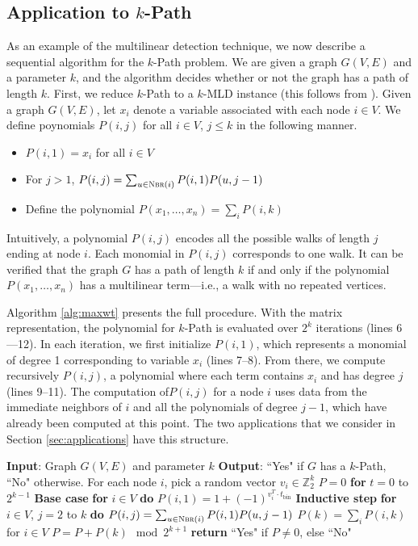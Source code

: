 \subsection{Application to $k$-Path}
As an example of the multilinear detection technique, we now describe a sequential algorithm for the $k$-Path problem. We are given a graph $G(V,E)$ and a parameter $k$, and the algorithm decides whether or not the graph has a path of length $k$. First, we reduce $k$-Path to a $k$-MLD instance (this follows from \cite{koutis:icalp08, williams2009finding}). Given a graph $G(V, E)$, let $x_i$ denote a variable associated with each node $i\in V$.
We define poynomials $P(i, j)$ for all $i\in V$, $j\leq k$ in the following manner.

\begin{itemize}
\item
$P(i, 1) = x_i$ for all $i\in V$
\item
For $j>1$,
$P(i, j) = \sum_{u\in\textsc{Nbr}(i)} P(i,1)P(u, j-1)$
\item
Define the polynomial $P(x_1,\ldots,x_n) = \sum_i P(i, k)$
\end{itemize}

Intuitively, a polynomial $P(i, j)$ encodes all the possible walks of length $j$ ending at node $i$. Each monomial in $P(i,j)$ corresponds to one walk. It can be verified that the graph $G$ has a path of length $k$ if and only if the polynomial $P(x_1,\ldots,x_n)$ has a multilinear term---i.e., a walk with no repeated vertices. 

Algorithm \ref{alg:maxwt} presents the full procedure. With the matrix representation, the polynomial for $k$-Path is evaluated over $2^k$ iterations (lines 6---12). In each iteration, we first initialize $P(i, 1)$, which represents a monomial of degree 1 corresponding to variable $x_i$
(lines 7--8). From there, we compute recursively $P(i,j)$, a polynomial where each term contains $x_i$ and has degree $j$ (lines 9--11). The computation of$P(i,j)$ for a node $i$ uses data from the immediate neighbors of $i$ and all the polynomials of degree $j-1$, which have already been computed at this point. The two applications that we consider in Section \ref{sec:applications} have this structure.

\begin{algorithm}{}
\small
\caption{\small \maxwt{}$(G(V, E), k)$.}
\label{alg:maxwt}
\begin{algorithmic}[1]
\STATE \textbf{Input}: Graph $G(V, E)$ and parameter $k$
\STATE\textbf{Output}: ``Yes" if $G$ has a $k$-Path, ``No" otherwise.
\STATE
\STATE For each node $i$, pick a random vector $v_i \in \mathbb{Z}_{2}^k$
\STATE $P = 0$
\STATE \textbf{for} $t = 0$ to $2^{k-1}$
\STATE \quad \textbf{Base case}
\STATE \quad \textbf{for} $i \in V$ \textbf{do}
\STATE \quad \quad $P(i, 1) = 1 + (-1)^{v_i^T \cdot t_{\text{bin}}}$
\STATE \quad \textbf{Inductive step}
\STATE \quad \textbf{for} $i \in V$, $j = 2$ to $k$ \textbf{do}
\STATE \quad \quad
$P(i,j) = \sum_{u \in \textsc{Nbr}(i)} P(i, 1)P(u, j-1)$
\STATE \quad $P(k) = \sum_i P(i,k)$ for $i \in V$
\STATE \quad $P = P + P(k)  \mod 2^{k+1}$
\STATE \textbf{return} ``Yes" if $P \neq 0$, else ``No"
\end{algorithmic}
\end{algorithm}